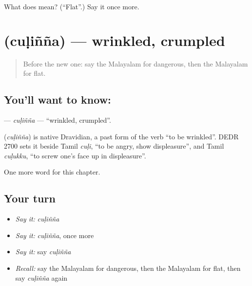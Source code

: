 \begin{tcolorbox}[breakable,colback=teal!4,colframe=teal!35!black,title={Before you move on}]
What does  mean? (\textquotedblleft{}Flat\textquotedblright{}.) Say it once more.
\end{tcolorbox}
\section[\texorpdfstring{\ml{ചുളിഞ്ഞ} (cuḷiñña)}{ചുളിഞ്ഞ (cuḷiñña)}]{ (cuḷiñña) — wrinkled, crumpled}

\label{lesson:ML-C285-culinna}



\begin{quote}
Before the new one: say the Malayalam for dangerous, then the Malayalam for flat.
\end{quote}

\subsection*{You'll want to know: }
\textbf{} — \emph{cuḷiñña} — \textquotedblleft{}wrinkled, crumpled\textquotedblright{}.

\begin{cousinweb}
\textbf{} (\emph{cuḷiñña}) is native Dravidian, a past form of the verb \textquotedblleft{}to be wrinkled\textquotedblright{}. DEDR 2700 sets it beside Tamil \emph{cuḷi}, \textquotedblleft{}to be angry, show displeasure\textquotedblright{}, and Tamil \emph{cuḷukku}, \textquotedblleft{}to screw one's face up in displeasure\textquotedblright{}.
\end{cousinweb}

\begin{grammarlens}[title={What you've built}]
One more word for this chapter.
\end{grammarlens}

\subsection*{Your turn}
\begin{itemize}
\raggedright
  \item \emph{Say it:} \emph{cuḷiñña}
  \item \emph{Say it:} \emph{cuḷiñña}, once more
  \item \emph{Say it:} say \emph{cuḷiñña}
  \item \emph{Recall:} say the Malayalam for dangerous, then the Malayalam for flat, then say \emph{cuḷiñña} again
\end{itemize}

